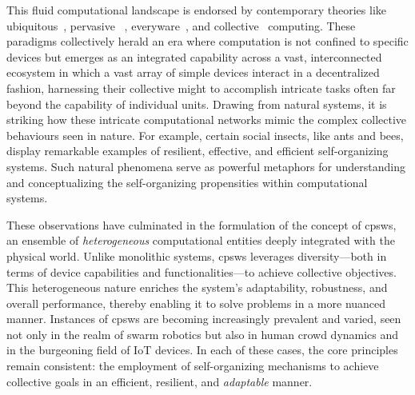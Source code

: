 \begin{refsection}
This fluid computational landscape is endorsed by contemporary theories like  ubiquitous~\cite{ubiquitous}, pervasive
 ~\cite{DBLP:journals/computer/SahaM03}, everyware~\cite{greenfield2010everyware}, and collective~\cite{DBLP:journals/computer/Abowd16} computing.
%
These paradigms collectively herald an era where computation 
 is not confined to specific devices but emerges as an integrated capability across a vast, 
 interconnected ecosystem in which a vast array of simple devices interact in a decentralized fashion, 
 harnessing their collective might to accomplish intricate tasks often far beyond the capability of individual units. 
%
Drawing from natural systems, 
 it is striking how these intricate computational networks mimic the complex collective behaviours seen in nature. 
 For example, certain social insects, like ants and bees, display remarkable examples of resilient, effective, and efficient self-organizing systems. 
 Such natural phenomena serve as powerful metaphors for understanding and conceptualizing the self-organizing propensities within computational systems.
 
These observations have culminated in the formulation of the concept of \acp{cpsw}, 
 an ensemble of \emph{heterogeneous} computational entities deeply integrated with the physical world. Unlike monolithic systems, \acp{cpsw} leverages diversity—both in terms of device capabilities and functionalities—to achieve collective objectives. 
 This heterogeneous nature enriches the system's adaptability, robustness, and overall performance, thereby enabling it to solve problems in a more nuanced manner.
%
Instances of \acp{cpsw} are becoming increasingly prevalent and varied, 
 seen not only in the realm of swarm robotics but also in human crowd dynamics and in the burgeoning field of IoT devices. 
 In each of these cases, the core principles remain consistent: the employment of self-organizing mechanisms to achieve collective goals in an efficient, resilient, and \emph{adaptable} manner.


\end{refsection}
